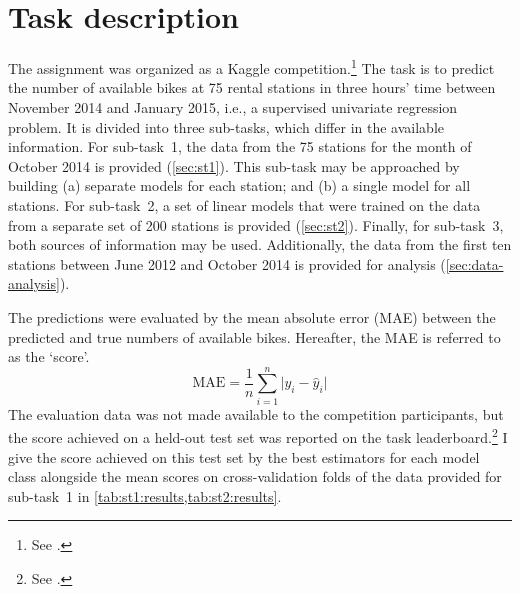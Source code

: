 \section{Task description}
\label{sec:task-description}

The assignment was organized as a Kaggle competition.\footnote{See .
}
The task is to predict the number of available bikes at 75 rental stations in three
hours' time between November 2014 and January 2015, i.e., a supervised univariate
regression problem.
It is divided into three sub-tasks, which differ in the available information.
For sub-task~1, the data from the 75 stations for the month of October 2014 is provided
(\cref{sec:st1}).
This sub-task may be approached by building (a) separate models for each station; and
(b) a single model for all stations.
For sub-task~2, a set of linear models that were trained on the data from a separate
set of 200 stations is provided (\cref{sec:st2}).
Finally, for sub-task~3, both sources of information may be used.
Additionally, the data from the first ten stations between June 2012 and October 2014
is provided for analysis (\cref{sec:data-analysis}).

The predictions were evaluated by the mean absolute error (MAE) between the predicted
and true numbers of available bikes.
Hereafter, the MAE is referred to as the `score'.
\begin{equation}
  \text{MAE} = \frac{1}{n} \sum_{i = 1}^n \lvert y_i - \hat{y}_i \rvert
\end{equation}
The evaluation data was not made available to the competition participants, but the
score achieved on a held-out test set was reported on the task
leaderboard.\footnote{See .
}
I give the score achieved on this test set by the best estimators for each model class
alongside the mean scores on cross-validation folds of the data provided for sub-task~1
in \cref{tab:st1:results,tab:st2:results}.
